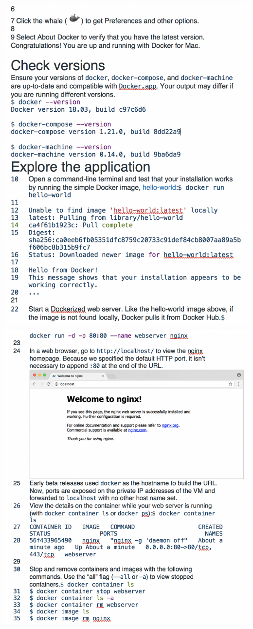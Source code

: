\documentclass[12pt, letterpaper]{article}
\begin{document}
\includegraphics[width=1\textwidth, right]{Install Docker3.png}
\includegraphics[width=1\textwidth, right]{Install Docker4.png}





\end{document}
